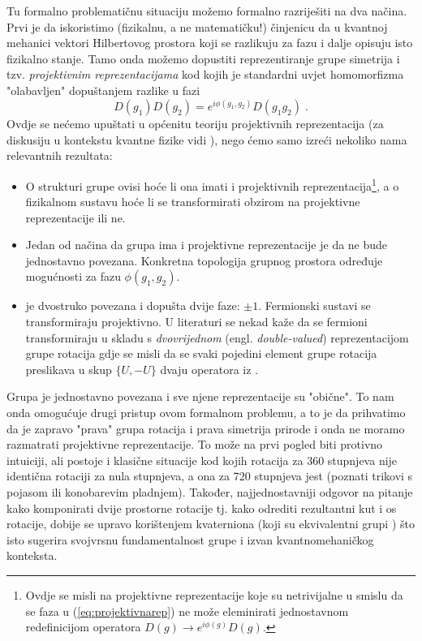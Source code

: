 Tu formalno problematičnu situaciju možemo formalno razriješiti na dva
načina. Prvi je da iskoristimo (fizikalnu, a ne matematičku!)
činjenicu da u kvantnoj mehanici vektori Hilbertovog prostora koji
se razlikuju za fazu i dalje opisuju isto fizikalno stanje.
Tamo onda možemo dopustiti reprezentiranje grupe simetrija i tzv.
\emph{projektivnim reprezentacijama} kod kojih je standardni
uvjet homomorfizma "olabavljen" dopuštanjem razlike u fazi
\begin{displaymath}
   D(g_1)D(g_2)=e^{i \phi(g_1,g_2)}D(g_1 g_2) \;.
   \label{eq:projektivnarep}
\end{displaymath}
Ovdje se nećemo upuštati u općenitu teoriju projektivnih reprezentacija 
(za diskusiju u kontekstu kvantne fizike vidi \cite{Weinberg:1995mt}),
nego ćemo samo izreći nekoliko nama relevantnih rezultata:

\begin{itemize}
    \item O strukturi grupe ovisi hoće li ona imati i projektivnih 
        reprezentacija\footnote{Ovdje se misli na projektivne reprezentacije
        koje su netrivijalne u smislu da se faza u (\ref{eq:projektivnarep})
        ne može eleminirati jednostavnom redefinicijom operatora $D(g) \to
        e^{i\phi(g)}D(g)$.}, a o fizikalnom sustavu hoće li se transformirati 
        obzirom na projektivne reprezentacije ili ne.

    \item  Jedan od načina da grupa ima i projektivne reprezentacije je da
           ne bude jednostavno povezana. Konkretna topologija grupnog prostora
           određuje mogućnosti za fazu $\phi(g_1,g_2)$.

    \item {} je dvostruko povezana i dopušta dvije faze: $\pm 1$. Fermionski
          sustavi se transformiraju projektivno. U literaturi se nekad kaže
          da se fermioni transformiraju u skladu s \emph{dvovrijednom} (engl.
          \emph{double-valued}) reprezentacijom grupe rotacija gdje se misli
          da se svaki pojedini element grupe rotacija preslikava
          u skup $\{U, -U\}$ dvaju operatora iz .
\end{itemize}

Grupa  je jednostavno povezana i sve njene reprezentacije su "obične".
To nam onda omogućuje drugi pristup ovom formalnom problemu, a to je da
prihvatimo da je zapravo  "prava" grupa rotacija i prava simetrija prirode
i onda ne moramo razmatrati projektivne reprezentacije.
To može na prvi pogled biti protivno intuiciji, ali postoje i klasične
situacije kod kojih rotacija za 360 stupnjeva nije identična
rotaciji za nula stupnjeva, a ona za 720 stupnjeva jest (poznati trikovi
s pojasom ili konobarevim pladnjem). Također, najjednostavniji odgovor na
pitanje kako komponirati dvije prostorne rotacije tj. kako odrediti
rezultantni kut i os rotacije, dobije se upravo korištenjem
kvaterniona (koji su ekvivalentni grupi ) što isto sugerira svojvrsnu
fundamentalnost grupe  i izvan kvantnomehaničkog konteksta.

